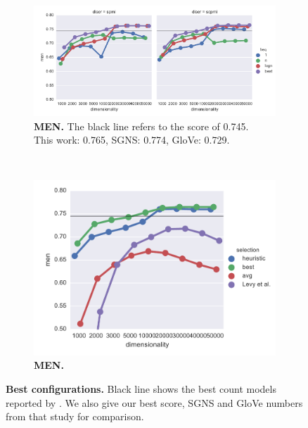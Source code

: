 \begin{figure}
  \begin{subfigure}[t]{0.6\textwidth}
    \includegraphics[width=\textwidth]{supplement/figures/men-best}
    \caption{\textbf{MEN.} The black line refers to the score of 0.745. \\
      This work: 0.765,
      SGNS: 0.774,
      GloVe: 0.729.
    }
    \label{fig:best-men}
  \end{subfigure}
  ~
  \begin{subfigure}[t]{0.37\textwidth}
    \includegraphics[width=\textwidth]{supplement/figures/men-global-best}
    \caption{\textbf{MEN.}
    }
    \label{fig:global-best-men}
  \end{subfigure}

  \caption{\textbf{Best configurations.} Black line shows the best count models reported by \protect{}. We also give our best score, SGNS and GloVe numbers from that study for comparison.}
  \label{fig:best}
\end{figure}

